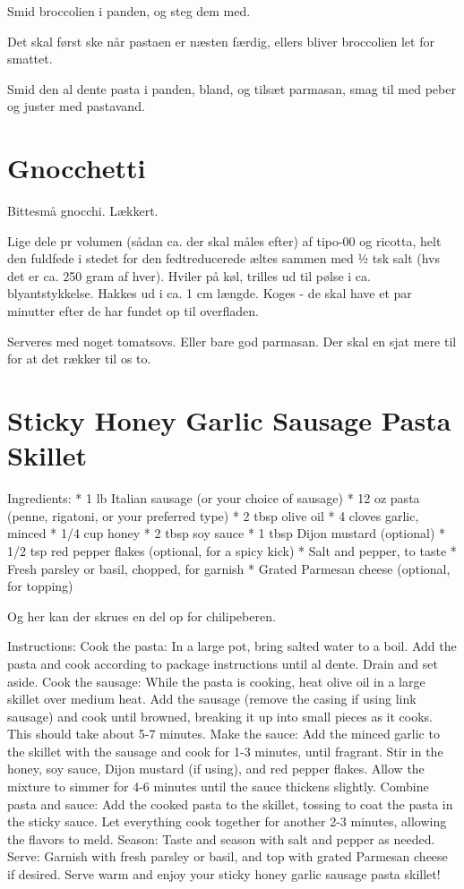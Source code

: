 \documentclass[
]{book}
\begin{document}
Smid broccolien i panden, og steg dem med.

Det skal først ske når pastaen er næsten færdig, ellers bliver broccolien let for smattet.

Smid den al dente pasta i panden, bland, og tilsæt parmasan, smag til med peber og juster med pastavand.

\section{Gnocchetti}\label{gnocchetti}

Bittesmå gnocchi. Lækkert.

Lige dele pr volumen (sådan ca. der skal måles efter) af tipo-00 og ricotta,
helt den fuldfede i stedet for den fedtreducerede æltes sammen med ½ tsk salt
(hvs det er ca. 250 gram af hver).
Hviler på køl, trilles ud til pølse i ca. blyantstykkelse.
Hakkes ud i ca. 1 cm længde.
Koges - de skal have et par minutter efter de har fundet op til overfladen.

Serveres med noget tomatsovs. Eller bare god parmasan. Der skal en sjat mere
til for at det rækker til os to.

\section{Sticky Honey Garlic Sausage Pasta Skillet}\label{sticky-honey-garlic-sausage-pasta-skillet}

Ingredients:
* 1 lb Italian sausage (or your choice of sausage)
* 12 oz pasta (penne, rigatoni, or your preferred type)
* 2 tbsp olive oil
* 4 cloves garlic, minced
* 1/4 cup honey
* 2 tbsp soy sauce
* 1 tbsp Dijon mustard (optional)
* 1/2 tsp red pepper flakes (optional, for a spicy kick)
* Salt and pepper, to taste
* Fresh parsley or basil, chopped, for garnish
* Grated Parmesan cheese (optional, for topping)

Og her kan der skrues en del op for chilipeberen.

Instructions:
Cook the pasta: In a large pot, bring salted water to a boil. Add the pasta and cook according to package instructions until al dente. Drain and set aside.
Cook the sausage: While the pasta is cooking, heat olive oil in a large skillet over medium heat. Add the sausage (remove the casing if using link sausage) and cook until browned, breaking it up into small pieces as it cooks. This should take about 5-7 minutes.
Make the sauce: Add the minced garlic to the skillet with the sausage and cook for 1-3 minutes, until fragrant. Stir in the honey, soy sauce, Dijon mustard (if using), and red pepper flakes. Allow the mixture to simmer for 4-6 minutes until the sauce thickens slightly.
Combine pasta and sauce: Add the cooked pasta to the skillet, tossing to coat the pasta in the sticky sauce. Let everything cook together for another 2-3 minutes, allowing the flavors to meld.
Season: Taste and season with salt and pepper as needed.
Serve: Garnish with fresh parsley or basil, and top with grated Parmesan cheese if desired. Serve warm and enjoy your sticky honey garlic sausage pasta skillet!
\end{document}

